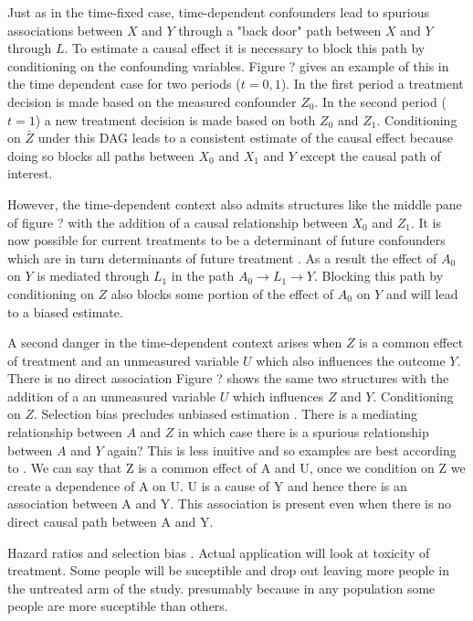 \documentclass[11pt]{article}
\begin{document}
Just as in the time-fixed case, time-dependent confounders lead to
spurious associations between \(X\) and \(Y\) through a "back door" path
between \(X\) and \(Y\) through \(L\). To estimate a causal effect it is
necessary to block this path by conditioning on the confounding
variables. Figure ? gives an example of this in the time dependent case
for two periods (\(t = 0, 1\)). In the first period a treatment decision
is made based on the measured confounder \(Z_0\). In the second period
(\(t = 1\)) a new treatment decision is made based on both \(Z_0\) and
\(Z_1\). Conditioning on \(\bar Z\) under this DAG leads to a consistent
estimate of the causal effect because doing so blocks all paths between
\(X_0\) and \(X_1\) and \(Y\) except the causal path of interest.
\linebreak

However, the time-dependent context also admits structures like the
middle pane of figure ? with the addition of a causal relationship
between \(X_0\) and \(Z_1\). It is now possible for current treatments
to be a determinant of future confounders which are in turn determinants
of future treatment \citet{Robins2000a}. As a result the effect of
\(A_0\) on \(Y\) is mediated through \(L_1\) in the path
\(A_0 \rightarrow L_1 \rightarrow Y\). Blocking this path by
conditioning on \(Z\) also blocks some portion of the effect of \(A_0\)
on \(Y\) and will lead to a biased estimate. \linebreak

A second danger in the time-dependent context arises when \(Z\) is a
common effect of treatment and an unmeasured variable \(U\) which also
influences the outcome \(Y\). There is no direct association Figure ?
shows the same two structures with the addition of a an unmeasured
variable \(U\) which influences \(Z\) and \(Y\). Conditioning on \(Z\).
Selection bias precludes unbiased estimation \citet{Hernan2004}. There
is a mediating relationship between \(A\) and \(Z\) in which case there
is a spurious relationship between \(A\) and \(Y\) again? This is less
inuitive and so examples are best according to \citet{Cole2010}. We can
say that Z is a common effect of A and U, once we condition on Z we
create a dependence of A on U. U is a cause of Y and hence there is an
association between A and Y. This association is present even when there
is no direct causal path between A and Y. \linebreak

Hazard ratios and selection bias \citet{Hernan2010}. Actual application
will look at toxicity of treatment. Some people will be suceptible and
drop out leaving more people in the untreated arm of the study.
presumably because in any population some people are more suceptible
than others.
\end{document}
